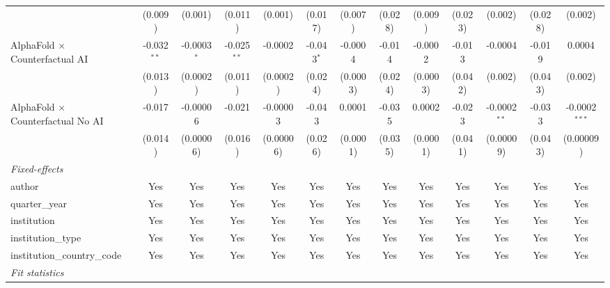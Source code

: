 \begin{tabular}{lcccccccccccc}
                                            & (0.009)       & (0.001)       & (0.011)       & (0.001)   & (0.017)      & (0.007)      & (0.028) & (0.009)      & (0.023) & (0.002)        & (0.028) & (0.002)\\   
   AlphaFold $\times$ Counterfactual AI     & -0.032$^{**}$ & -0.0003$^{*}$ & -0.025$^{**}$ & -0.0002   & -0.043$^{*}$ & -0.0004      & -0.014  & -0.0002      & -0.013  & -0.0004        & -0.019  & 0.0004\\   
                                            & (0.013)       & (0.0002)      & (0.011)       & (0.0002)  & (0.024)      & (0.0003)     & (0.024) & (0.0003)     & (0.042) & (0.002)        & (0.043) & (0.002)\\   
   AlphaFold $\times$ Counterfactual No AI  & -0.017        & -0.00006      & -0.021        & -0.00003  & -0.043       & 0.0001       & -0.035  & 0.0002       & -0.023  & -0.0002$^{**}$ & -0.033  & -0.0002$^{***}$\\   
                                            & (0.014)       & (0.00006)     & (0.016)       & (0.00006) & (0.026)      & (0.0001)     & (0.035) & (0.0001)     & (0.041) & (0.00009)      & (0.043) & (0.00009)\\   
   \midrule
   \emph{Fixed-effects}\\
   author                                   & Yes           & Yes           & Yes           & Yes       & Yes          & Yes          & Yes     & Yes          & Yes     & Yes            & Yes     & Yes\\  
   quarter\_year                            & Yes           & Yes           & Yes           & Yes       & Yes          & Yes          & Yes     & Yes          & Yes     & Yes            & Yes     & Yes\\  
   institution                              & Yes           & Yes           & Yes           & Yes       & Yes          & Yes          & Yes     & Yes          & Yes     & Yes            & Yes     & Yes\\  
   institution\_type                        & Yes           & Yes           & Yes           & Yes       & Yes          & Yes          & Yes     & Yes          & Yes     & Yes            & Yes     & Yes\\  
   institution\_country\_code               & Yes           & Yes           & Yes           & Yes       & Yes          & Yes          & Yes     & Yes          & Yes     & Yes            & Yes     & Yes\\  
   \midrule
   \emph{Fit statistics}\\

\end{tabular}
